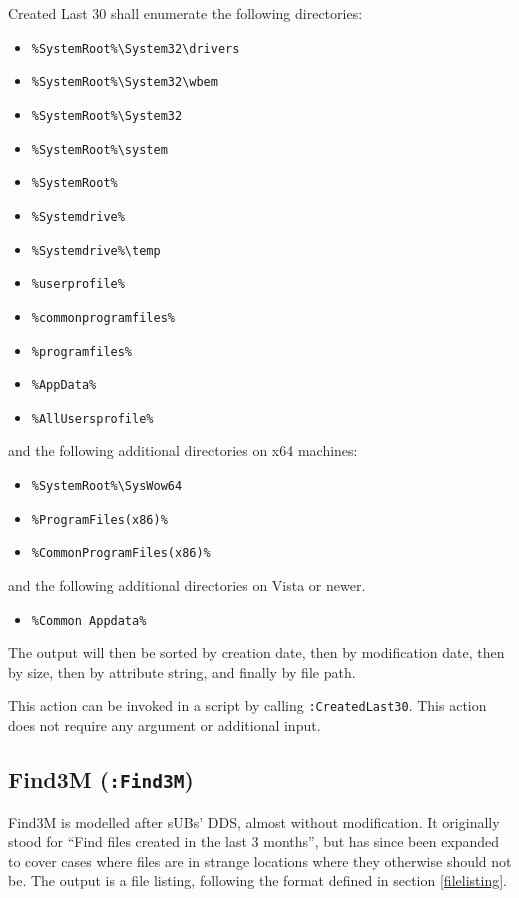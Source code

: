 Created Last 30 shall enumerate the following directories:
\begin{itemize}
    \item \verb|%SystemRoot%\System32\drivers|
	\item \verb|%SystemRoot%\System32\wbem|
	\item \verb|%SystemRoot%\System32|
	\item \verb|%SystemRoot%\system|
	\item \verb|%SystemRoot%|
	\item \verb|%Systemdrive%|
	\item \verb|%Systemdrive%\temp|
	\item \verb|%userprofile%|
	\item \verb|%commonprogramfiles%|
	\item \verb|%programfiles%|
	\item \verb|%AppData%|
	\item \verb|%AllUsersprofile%|
\end{itemize}
and the following additional directories on x64 machines:
\begin{itemize}
	\item \verb|%SystemRoot%\SysWow64|
	\item \verb|%ProgramFiles(x86)%|
	\item \verb|%CommonProgramFiles(x86)%|
\end{itemize}
and the following additional directories on Vista or newer.
\begin{itemize}
    \item \verb|%Common Appdata%|
\end{itemize}

The output will then be sorted by creation date, then by modification date, then
by size, then by attribute string, and finally by file path.

This action can be invoked in a script by calling \verb|:CreatedLast30|.
This action does not require any argument or additional input.

\subsection{Find3M (\texttt{:Find3M})}
Find3M is modelled after sUBs' DDS, almost without modification. It
originally stood for ``Find files created in the last 3 months'', but has since been expanded to
cover cases where files are in strange locations where they otherwise should not
be. The output is a file listing, following the format defined in section
\ref{filelisting}.

